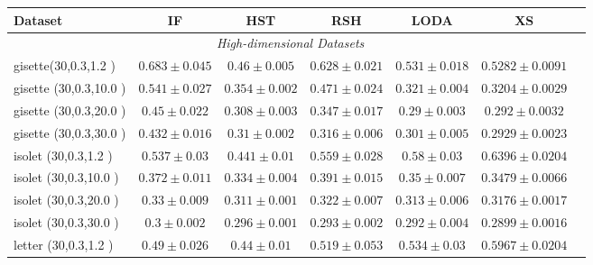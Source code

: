 \begin{footnotesize}
\begin{table}[p!]
		\begin{tabular}{lcccccc}
				\toprule
				\textbf{Dataset} & \textbf{IF} &  \textbf{HST} & \textbf{RSH} &  \textbf{LODA}  & \textbf{XS}\\
				\midrule
				\multicolumn{6}{c}{\textit{High-dimensional Datasets}}\\
gisette(30,0.3,1.2 )& $0.683 \pm 0.045$ &  $0.46 \pm 0.005$ &  $0.628 \pm 0.021$ &  $0.531 \pm 0.018$ &  $0.5282 \pm 0.0091$    \\
gisette (30,0.3,10.0 )& $0.541 \pm 0.027$ &  $0.354 \pm 0.002$ &  $0.471 \pm 0.024$ &  $0.321 \pm 0.004$ &  $0.3204 \pm 0.0029$    \\
gisette (30,0.3,20.0 )& $0.45 \pm 0.022$ &  $0.308 \pm 0.003$ &  $0.347 \pm 0.017$ &  $0.29 \pm 0.003$ &  $0.292 \pm 0.0032$    \\
gisette (30,0.3,30.0 )& $0.432 \pm 0.016$ &  $0.31 \pm 0.002$ &  $0.316 \pm 0.006$ &  $0.301 \pm 0.005$ &  $0.2929 \pm 0.0023$    \\
\midrule
isolet (30,0.3,1.2 )& $0.537 \pm 0.03$ &  $0.441 \pm 0.01$ &  $0.559 \pm 0.028$ &  $0.58 \pm 0.03$ &  $0.6396 \pm 0.0204$    \\
isolet (30,0.3,10.0 )& $0.372 \pm 0.011$ &  $0.334 \pm 0.004$ &  $0.391 \pm 0.015$ &  $0.35 \pm 0.007$ &  $0.3479 \pm 0.0066$    \\
isolet (30,0.3,20.0 )& $0.33 \pm 0.009$ &  $0.311 \pm 0.001$ &  $0.322 \pm 0.007$ &  $0.313 \pm 0.006$ &  $0.3176 \pm 0.0017$    \\
isolet (30,0.3,30.0 )& $0.3 \pm 0.002$ &  $0.296 \pm 0.001$ &  $0.293 \pm 0.002$ &  $0.292 \pm 0.004$ &  $0.2899 \pm 0.0016$    \\
\midrule
letter (30,0.3,1.2 )& $0.49 \pm 0.026$ &  $0.44 \pm 0.01$ &  $0.519 \pm 0.053$ &  $0.534 \pm 0.03$ &  $0.5967 \pm 0.0204$    \\

\end{tabular}
\end{table}
\end{footnotesize}
